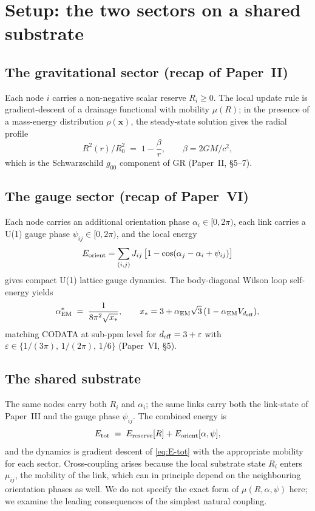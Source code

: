 \documentclass[11pt,a4paper]{article}
\begin{document}
\section{Setup: the two sectors on a shared substrate}
\label{sec:setup}

\subsection{The gravitational sector (recap of Paper~II)}

Each node $i$ carries a non-negative scalar reserve $R_i \geq
0$. The local update rule is gradient-descent of a drainage
functional with mobility $\mu(R)$; in the presence of a
mass-energy distribution $\rho(\mathbf{x})$, the steady-state
solution gives the radial profile
\begin{equation}
R^2(r)/R_0^2 \;=\; 1 - \frac{\beta}{r},
\qquad \beta = 2GM/c^2,
\label{eq:Schwarzschild-DDD}
\end{equation}
which is the Schwarzschild $g_{00}$ component of GR (Paper~II,
\S5--7).

\subsection{The gauge sector (recap of Paper~VI)}

Each node carries an additional orientation phase $\alpha_i \in
[0, 2\pi)$, each link carries a U(1) gauge phase $\psi_{ij} \in
[0, 2\pi)$, and the local energy
\begin{equation}
E_{\rm orient} = \sum_{(i,j)} J_{ij}\,
\big[1 - \cos(\alpha_j - \alpha_i + \psi_{ij})\big]
\label{eq:Eorient-VII}
\end{equation}
gives compact U(1) lattice gauge dynamics. The body-diagonal
Wilson loop self-energy yields
\begin{equation}
\alpha_{\rm EM}^* \;=\; \frac{1}{8\pi^2 \sqrt{x_*}},
\qquad x_* = 3 + \alpha_{\rm EM}\sqrt{3}\,
(1 - \alpha_{\rm EM} V_{d_{\rm eff}}),
\label{eq:alpha-EM-recap}
\end{equation}
matching CODATA at sub-ppm level for $d_{\rm eff} = 3 +
\varepsilon$ with $\varepsilon \in \{1/(3\pi),\,1/(2\pi),\,
1/6\}$ (Paper~VI, \S5).

\subsection{The shared substrate}

The same nodes carry both $R_i$ and $\alpha_i$; the same links
carry both the link-state of Paper~III and the gauge phase
$\psi_{ij}$. The combined energy is
\begin{equation}
E_{\rm tot} \;=\; E_{\rm reserve}[R] + E_{\rm orient}
[\alpha, \psi],
\label{eq:E-tot}
\end{equation}
and the dynamics is gradient descent of \eqref{eq:E-tot} with
the appropriate mobility for each sector. Cross-coupling arises
because the local substrate state $R_i$ enters $\mu_{ij}$, the
mobility of the link, which can in principle depend on the
neighbouring orientation phases as well. We do not specify the
exact form of $\mu(R, \alpha, \psi)$ here; we examine the
leading consequences of the simplest natural coupling.
\end{document}
